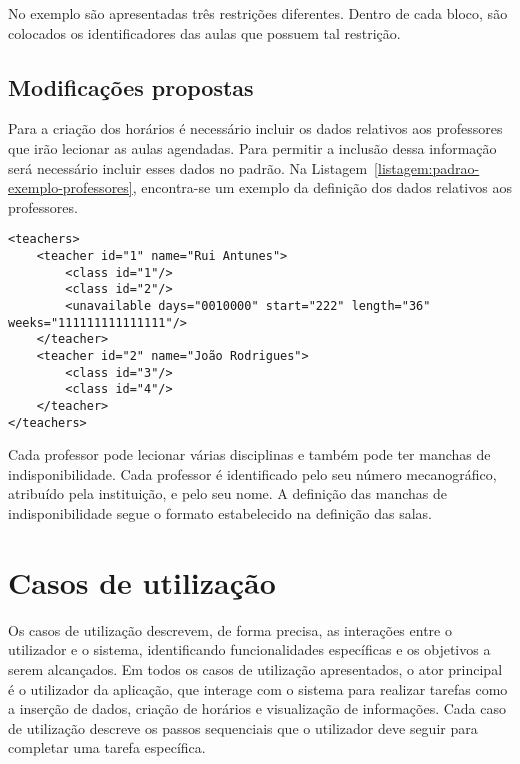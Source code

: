 No exemplo são apresentadas três restrições diferentes. Dentro de cada bloco, são colocados os identificadores das aulas que possuem tal restrição.

\subsection{Modificações propostas}

Para a criação dos horários é necessário incluir os dados relativos aos professores que irão lecionar as aulas agendadas. Para permitir a inclusão dessa informação será necessário incluir esses dados no padrão. Na Listagem~\ref{listagem:padrao-exemplo-professores}, encontra-se um exemplo da definição dos dados relativos aos professores.

\begin{minipage}[c]{\linewidth}
\begin{lstlisting}[caption={Exemplo da informação relacionada com os professores.}, label={listagem:padrao-exemplo-professores}]
<teachers>
    <teacher id="1" name="Rui Antunes">
        <class id="1"/>
        <class id="2"/>
        <unavailable days="0010000" start="222" length="36" weeks="111111111111111"/>
    </teacher>
    <teacher id="2" name="João Rodrigues">
        <class id="3"/>
        <class id="4"/>
    </teacher>
</teachers>
\end{lstlisting}
\end{minipage}

Cada professor pode lecionar várias disciplinas e também pode ter manchas de indisponibilidade. Cada professor é identificado pelo seu número mecanográfico, atribuído pela instituição, e pelo seu nome. A definição das manchas de indisponibilidade segue o formato estabelecido na definição das salas.

\section{Casos de utilização}
\label{capitulo3:Casos-util}

Os casos de utilização descrevem, de forma precisa, as interações entre o utilizador e o sistema, identificando funcionalidades específicas e os objetivos a serem alcançados. Em todos os casos de utilização apresentados, o ator principal é o utilizador da aplicação, que interage com o sistema para realizar tarefas como a inserção de dados, criação de horários e visualização de informações. Cada caso de utilização descreve os passos sequenciais que o utilizador deve seguir para completar uma tarefa específica.

